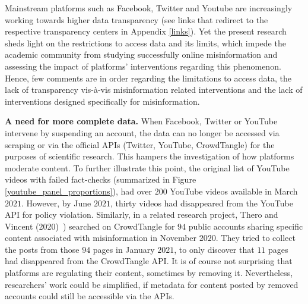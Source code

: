 \documentclass{article}
\begin{document}
\smallskip

Mainstream platforms such as Facebook, Twitter and Youtube are increasingly working towards higher data transparency (see links that redirect to the respective transparency centers in Appendix \ref{links}). 
Yet the present research sheds light on the restrictions to access data and its limits, which impede the academic community from studying successfully online misinformation and assessing the impact of platforms' interventions regarding this phenomenon. 
Hence, few comments are in order regarding the limitations to access data, the lack of transparency vis-\`{a}-vis misinformation related interventions and the lack of interventions designed specifically for misinformation. 

\smallskip

{\bf A need for more complete data.} 
When Facebook, Twitter or YouTube intervene by suspending an account, the data can no longer be accessed via scraping or via the official APIs (Twitter, YouTube, CrowdTangle) for the purposes of scientific research. 
This hampers the investigation of how platforms moderate content. 
To further illustrate this point, the original list of YouTube videos with failed fact-checks (summarized in Figure \ref{youtube_panel_proportions}), had over $200$ YouTube videos available in March $2021$. 
However, by June $2021$, thirty videos had disappeared from the YouTube API for policy violation. 
Similarly, in a related research project, Thero and Vincent (2020)~\cite{therovincent}) searched on CrowdTangle for $94$ public accounts sharing specific content associated with misinformation in November $2020$. 
They tried to collect the posts from those $94$ pages in January $2021$, to only discover that $11$ pages had disappeared from the CrowdTangle API.
It is of course not surprising that platforms are regulating their content, sometimes by removing it. 
Nevertheless, researchers' work could be simplified, if metadata for content posted by removed accounts could still be accessible via the APIs.
\end{document}
